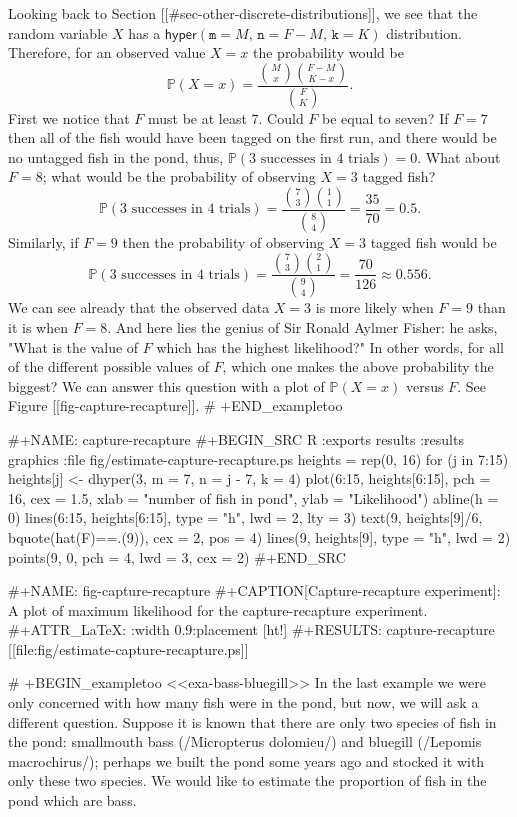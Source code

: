 Looking back to Section [[#sec-other-discrete-distributions]], we see that the
random variable \(X\) has a
\(\mathsf{hyper}(\mathtt{m}=M,\,\mathtt{n}=F-M,\,\mathtt{k}=K)\)
distribution. Therefore, for an observed value \(X=x\) the probability
would be \[ \mathbb{P}(X=x)=\frac{{M \choose x}{F-M \choose K-x}}{{F
\choose K}}.  \] First we notice that \(F\) must be at least 7. Could
\(F\) be equal to seven? If \(F=7\) then all of the fish would have
been tagged on the first run, and there would be no untagged fish in
the pond, thus, \(\mathbb{P}(\mbox{3 successes in 4 trials})=0\).
What about \(F=8\); what would be the probability of observing \(X=3\)
tagged fish?  \[ \mathbb{P}(\mbox{3 successes in 4 trials})=\frac{{7
\choose 3}{1 \choose 1}}{{8 \choose 4}}=\frac{35}{70}=0.5.  \]
Similarly, if \(F=9\) then the probability of observing \(X=3\) tagged
fish would be \[ \mathbb{P}(\mbox{3 successes in 4 trials})=\frac{{7
\choose 3}{2 \choose 1}}{{9 \choose 4}}=\frac{70}{126}\approx0.556.
\] We can see already that the observed data \(X=3\) is more likely
when \(F=9\) than it is when \(F=8\). And here lies the genius of Sir
Ronald Aylmer Fisher: he asks, "What is the value of \(F\) which has
the highest likelihood?" In other words, for all of the different
possible values of \(F\), which one makes the above probability the
biggest? We can answer this question with a plot of
\(\mathbb{P}(X=x)\) versus \(F\). See Figure
[[fig-capture-recapture]].
# +END_exampletoo

#+NAME: capture-recapture
#+BEGIN_SRC R :exports results :results graphics :file fig/estimate-capture-recapture.ps
heights = rep(0, 16)
for (j in 7:15) heights[j] <- dhyper(3, m = 7, n = j - 7, k = 4)
plot(6:15, heights[6:15], pch = 16, cex = 1.5, xlab = "number of fish in pond", ylab = "Likelihood")
abline(h = 0)
lines(6:15, heights[6:15], type = "h", lwd = 2, lty = 3)
text(9, heights[9]/6, bquote(hat(F)==.(9)), cex = 2, pos = 4)
lines(9, heights[9], type = "h", lwd = 2)
points(9, 0, pch = 4, lwd = 3, cex = 2)
#+END_SRC

#+NAME: fig-capture-recapture
#+CAPTION[Capture-recapture experiment]: \small A plot of maximum likelihood for the capture-recapture experiment.
#+ATTR_LaTeX: :width 0.9\textwidth :placement [ht!]
#+RESULTS: capture-recapture
[[file:fig/estimate-capture-recapture.ps]]


# +BEGIN_exampletoo
<<exa-bass-bluegill>> In the last example we were only concerned with
how many fish were in the pond, but now, we will ask a different
question. Suppose it is known that there are only two species of fish
in the pond: smallmouth bass (/Micropterus dolomieu/) and bluegill
(/Lepomis macrochirus/); perhaps we built the pond some years ago and
stocked it with only these two species. We would like to estimate the
proportion of fish in the pond which are bass.

